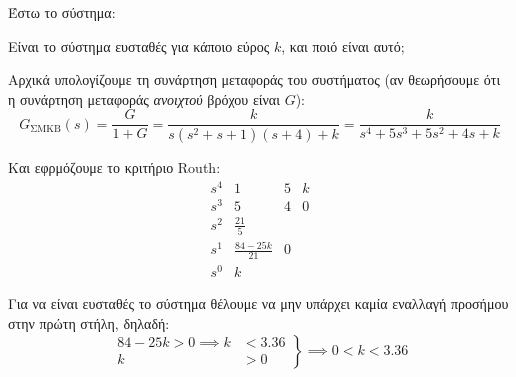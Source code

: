 \documentclass[11pt,a4paper,notitlepage,fleqn]{article}
\begin{document}
\begin{exercise}
Έστω το σύστημα:


Είναι το σύστημα ευσταθές για κάποιο εύρος \( k \), και ποιό είναι αυτό;

\tcblower
Αρχικά υπολογίζουμε τη συνάρτηση μεταφοράς του συστήματος (αν θεωρήσουμε ότι η συνάρτηση μεταφοράς \textit{ανοιχτού} βρόχου είναι
\(G\)):
\[
G_{\text{ΣΜΚΒ}}(s) = \frac{G}{1+G} = \frac{k}{s(s^2+s+1)(s+4)+k} = \frac{k}{s^4+5s^3+5s^2+4s+k}
\]

Και εφρμόζουμε το κριτήριο Routh:
\[
\begin{array}{r|ccc}
s^4&1&5&k\\
s^3&5&4&0\\
s^2&\frac{21}{5}&\\
s^1&\frac{84-25k}{21} & 0\\
s^0&k
\end{array}
\]

Για να είναι ευσταθές το σύστημα θέλουμε να μην υπάρχει καμία εναλλαγή προσήμου στην πρώτη στήλη, δηλαδή:
\[
\left.
\begin{aligned}
84-25k > 0 \implies k &< 3.36 \\
k&>0
\end{aligned}
\right\rbrace \implies 0 < k < 3.36
\]

\end{exercise}
\end{document}
